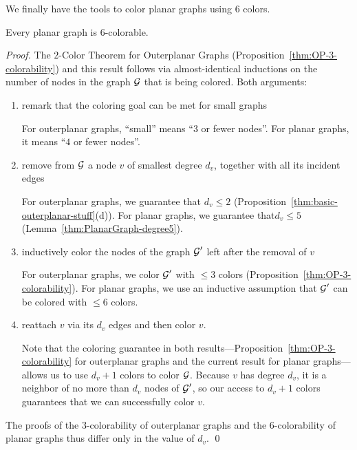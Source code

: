 \medskip

We finally have the tools to color planar graphs using $6$ colors.

\begin{prop}
\label{thm:P-6-colorability}
Every planar graph is $6$-colorable.
\end{prop}

\begin{proof}
The $2$-Color Theorem for Outerplanar Graphs
(Proposition~\ref{thm:OP-3-colorability}) and this result follows via
almost-identical inductions on the number of nodes in the graph $\mbox{$\cal G$}$
that is being colored.  Both arguments:
\begin{enumerate}
\item
remark that the coloring goal can be met for small graphs

For outerplanar graphs, ``small'' means ``$3$ or fewer nodes''.  For
planar graphs, it means ``$4$ or fewer nodes''.

\item
remove from $\mbox{$\cal G$}$ a node $v$ of smallest degree $d_v$, together with
all its incident edges

For outerplanar graphs, we guarantee that $d_v \leq 2$
(Proposition~\ref{thm:basic-outerplanar-stuff}(d)).  For planar
graphs, we guarantee that$d_v \leq 5$
(Lemma~\ref{thm:PlanarGraph-degree5}).

\item
inductively color the nodes of the graph $\mbox{$\cal G$}'$ left after the removal
of $v$

For outerplanar graphs, we color $\mbox{$\cal G$}'$ with $\leq 3$ colors
(Proposition~\ref{thm:OP-3-colorability}).  For planar
graphs, we use an inductive assumption that $\mbox{$\cal G$}'$ can be colored with
$\leq 6$ colors. 

\item
reattach $v$ via its $d_v$ edges and then color $v$.

Note that the coloring guarantee in both
results---Proposition~\ref{thm:OP-3-colorability} for outerplanar
graphs and the current result for planar graphs---allows us to use
$d_v +1$ colors to color $\mbox{$\cal G$}$.  Because $v$ has degree $d_v$, it is a
neighbor of no more than $d_v$ nodes of $\mbox{$\cal G$}'$, so our access to $d_v
+1$ colors guarantees that we can successfully color $v$.
\end{enumerate}
The proofs of the $3$-colorability of outerplanar graphs and the
$6$-colorability of planar graphs thus differ only in the value of
$d_v$.  \qed
\end{proof}


